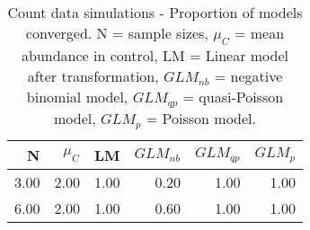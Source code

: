 \begin{table}[H]
\centering
\caption{Count data simulations - Proportion of models converged. N = sample sizes, 
             $\mu_C$ = mean abundance in control, LM = Linear model after transformation, 
             $GLM_{nb}$ = negative binomial model, $GLM_{qp}$ = quasi-Poisson model, $GLM_{p}$ = Poisson model.} 
\label{tab:conv}
{\footnotesize
\begin{tabular}{rrrrrr}
  \hline
N & $\mu_C$ & LM & $GLM_{nb}$ & $GLM_{qp}$ & $GLM_{p}$ \\ 
  \hline
3.00 & 2.00 & 1.00 & 0.20 & 1.00 & 1.00 \\ 
  6.00 & 2.00 & 1.00 & 0.60 & 1.00 & 1.00 \\ 
   \hline
\end{tabular}
}
\end{table}
